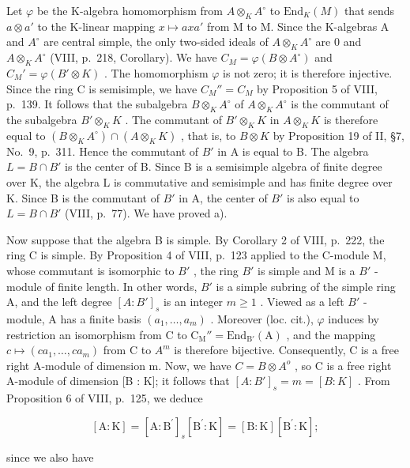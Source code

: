 Let \(\varphi\) be the K-algebra homomorphism from \(A \otimes_K A^\circ\) to \(\mathrm{End}_K(M)\) that sends \(a \otimes a'\) to the K-linear mapping \(x \mapsto axa'\) from M to M. Since the K-algebras A and \(A^\circ\) are central simple, the only two-sided ideals of \(A \otimes_K A^\circ\) are 0 and \(A \otimes_K A^\circ\) (VIII, p.~218, Corollary). We have \(C_M = \varphi(B \otimes A^\circ)\) and \(C_M' = \varphi(B' \otimes K)\) . The homomorphism \(\varphi\) is not zero; it is therefore injective. Since the ring C is semisimple, we have \(C_M'' = C_M\) by Proposition 5 of VIII, p.~139. It follows that the subalgebra \(B \otimes_K A^\circ\) of \(A \otimes_K A^\circ\) is the commutant of the subalgebra \(B' \otimes_K K\) . The commutant of \(B' \otimes_K K\) in \(A \otimes_K K\) is therefore equal to \((B \otimes_K A^\circ) \cap (A \otimes_K K)\) , that is, to \(B \otimes K\) by Proposition 19 of II, §7, No.~9, p.~311. Hence the commutant of \(B'\) in A is equal to B. The algebra \(L = B \cap B'\) is the center of B. Since B is a semisimple algebra of finite degree over K, the algebra L is commutative and semisimple and has finite degree over K. Since B is the commutant of \(B'\) in A, the center of \(B'\) is also equal to \(L = B \cap B'\) (VIII, p.~77). We have proved a).

Now suppose that the algebra B is simple. By Corollary 2 of VIII, p.~222, the ring C is simple. By Proposition 4 of VIII, p.~123 applied to the C-module M, whose commutant is isomorphic to \(B'\) , the ring \(B'\) is simple and M is a \(B'\) -module of finite length. In other words, \(B'\) is a simple subring of the simple ring A, and the left degree \([A : B']_{s}\) is an integer \(m \geqslant 1\) . Viewed as a left \(B'\) -module, A has a finite basis \((a_{1}, \ldots, a_{m})\) . Moreover (loc. cit.), \(\varphi\) induces by restriction an isomorphism from C to \(\mathrm{C}_{\mathrm{M}}'' = \mathrm{End}_{\mathrm{B}'}(\mathrm{A})\) , and the mapping \(c \mapsto (ca_{1}, \ldots, ca_{m})\) from C to \(A^{m}\) is therefore bijective. Consequently, C is a free right A-module of dimension m. Now, we have \(C = B \otimes A^{o}\) , so C is a free right A-module of dimension {[}B : K{]}; it follows that \([A : B']_{s} = m = [B : K]\) . From Proposition 6 of VIII, p.~125, we deduce

\[
[ \mathrm{A}: \mathrm{K} ] = [ \mathrm{A}: \mathrm{B} ^ {\prime} ] _ {s} [ \mathrm{B} ^ {\prime}: \mathrm{K} ] = [ \mathrm{B}: \mathrm{K} ] [ \mathrm{B} ^ {\prime}: \mathrm{K} ];
\]

since we also have


